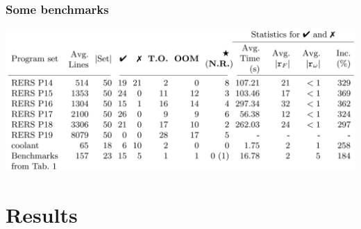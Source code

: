\documentclass[xcolor=dvipsnames]{beamer}
\begin{document}
\begin{frame}
	\frametitle{Some benchmarks}
    \includegraphics[width=\textwidth,height=0.9\textheight,keepaspectratio]{table-small.jpg}
\end{frame}
\section{Results}
\end{document}
